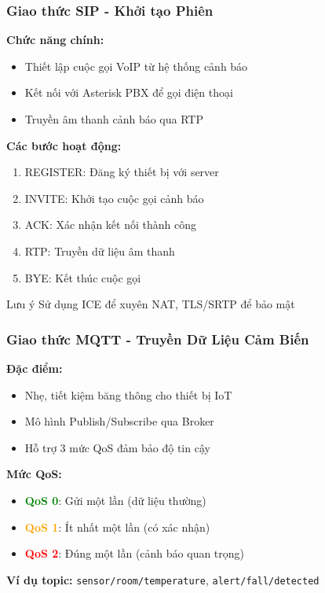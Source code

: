 \begin{frame}
\frametitle{Giao thức SIP - Khởi tạo Phiên}

\textbf{Chức năng chính:}
\begin{itemize}
\item Thiết lập cuộc gọi VoIP từ hệ thống cảnh báo
\item Kết nối với Asterisk PBX để gọi điện thoại
\item Truyền âm thanh cảnh báo qua RTP
\end{itemize}

\textbf{Các bước hoạt động:}
\begin{enumerate}
\item REGISTER: Đăng ký thiết bị với server
\item INVITE: Khởi tạo cuộc gọi cảnh báo
\item ACK: Xác nhận kết nối thành công
\item RTP: Truyền dữ liệu âm thanh
\item BYE: Kết thúc cuộc gọi
\end{enumerate}

\begin{alertblock}{Lưu ý}
Sử dụng ICE để xuyên NAT, TLS/SRTP để bảo mật
\end{alertblock}
\end{frame}

\begin{frame}
\frametitle{Giao thức MQTT - Truyền Dữ Liệu Cảm Biến}

\textbf{Đặc điểm:}
\begin{itemize}
\item Nhẹ, tiết kiệm băng thông cho thiết bị IoT
\item Mô hình Publish/Subscribe qua Broker
\item Hỗ trợ 3 mức QoS đảm bảo độ tin cậy
\end{itemize}

\textbf{Mức QoS:}
\begin{itemize}
\item \textcolor{green}{\textbf{QoS 0}}: Gửi một lần (dữ liệu thường)
\item \textcolor{orange}{\textbf{QoS 1}}: Ít nhất một lần (có xác nhận)
\item \textcolor{red}{\textbf{QoS 2}}: Đúng một lần (cảnh báo quan trọng)
\end{itemize}

\textbf{Ví dụ topic:} \texttt{sensor/room/temperature}, \texttt{alert/fall/detected}
\end{frame}

